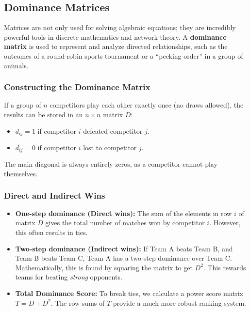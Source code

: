 
\subsection{Dominance Matrices}

Matrices are not only used for solving algebraic equations; they are incredibly powerful tools in discrete mathematics and network theory. A \textbf{dominance matrix} is used to represent and analyze directed relationships, such as the outcomes of a round-robin sports tournament or a ``pecking order'' in a group of animals.

\subsubsection*{Constructing the Dominance Matrix}

If a group of $n$ competitors play each other exactly once (no draws allowed), the results can be stored in an $n \times n$ matrix $D$:
\begin{itemize}[leftmargin=*]
  \item $d_{ij} = 1$ if competitor $i$ defeated competitor $j$.
  \item $d_{ij} = 0$ if competitor $i$ lost to competitor $j$.
\end{itemize}
The main diagonal is always entirely zeros, as a competitor cannot play themselves. 

\subsubsection*{Direct and Indirect Wins}

\begin{itemize}[leftmargin=*]
  \item \textbf{One-step dominance (Direct wins):} The sum of the elements in row $i$ of matrix $D$ gives the total number of matches won by competitor $i$. However, this often results in ties.
  \item \textbf{Two-step dominance (Indirect wins):} If Team A beats Team B, and Team B beats Team C, Team A has a two-step dominance over Team C. Mathematically, this is found by squaring the matrix to get $D^2$. This rewards teams for beating \emph{strong} opponents.
  \item \textbf{Total Dominance Score:} To break ties, we calculate a power score matrix $T = D + D^2$. The row sums of $T$ provide a much more robust ranking system.
\end{itemize}

